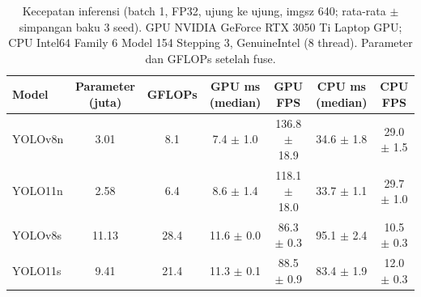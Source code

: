 \begin{table}[!t]
\centering
\caption{Kecepatan inferensi (batch 1, FP32, ujung ke ujung, imgsz 640; rata-rata $\pm$ simpangan baku 3 seed). GPU NVIDIA GeForce RTX 3050 Ti Laptop GPU; CPU Intel64 Family 6 Model 154 Stepping 3, GenuineIntel (8 thread). Parameter dan GFLOPs setelah fuse.}
\label{tab:kecepatan}
\footnotesize
\begin{tabular}{lcccccc}
\hline
\textbf{Model} & \textbf{Parameter (juta)} & \textbf{GFLOPs} & \textbf{GPU ms (median)} & \textbf{GPU FPS} & \textbf{CPU ms (median)} & \textbf{CPU FPS} \\
\hline
YOLOv8n & 3.01 & 8.1 & 7.4 $\pm$ 1.0 & 136.8 $\pm$ 18.9 & 34.6 $\pm$ 1.8 & 29.0 $\pm$ 1.5 \\
YOLO11n & 2.58 & 6.4 & 8.6 $\pm$ 1.4 & 118.1 $\pm$ 18.0 & 33.7 $\pm$ 1.1 & 29.7 $\pm$ 1.0 \\
YOLOv8s & 11.13 & 28.4 & 11.6 $\pm$ 0.0 & 86.3 $\pm$ 0.3 & 95.1 $\pm$ 2.4 & 10.5 $\pm$ 0.3 \\
YOLO11s & 9.41 & 21.4 & 11.3 $\pm$ 0.1 & 88.5 $\pm$ 0.9 & 83.4 $\pm$ 1.9 & 12.0 $\pm$ 0.3 \\
\hline
\end{tabular}
\end{table}
